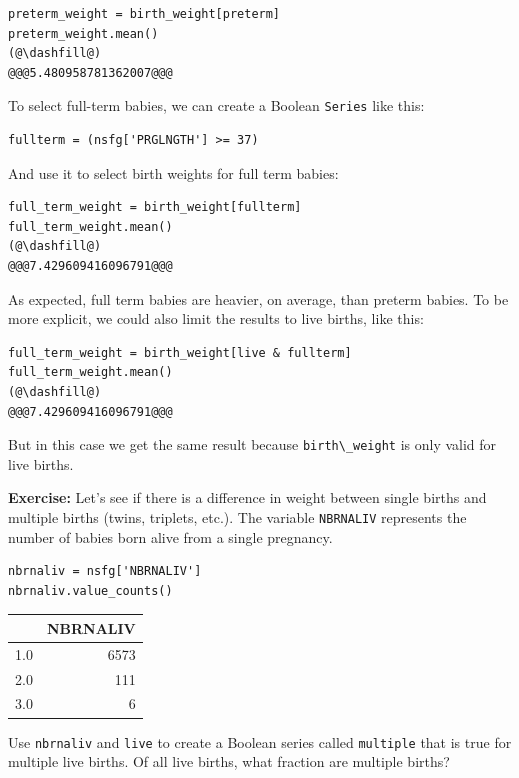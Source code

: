 \begin{lstlisting}[]
preterm_weight = birth_weight[preterm]
preterm_weight.mean()
(@\dashfill@)
@@@5.480958781362007@@@
\end{lstlisting}

To select full-term babies, we can create a Boolean
\passthrough{\lstinline!Series!} like this:

\begin{lstlisting}[]
fullterm = (nsfg['PRGLNGTH'] >= 37)
\end{lstlisting}

And use it to select birth weights for full term babies:

\begin{lstlisting}[]
full_term_weight = birth_weight[fullterm]
full_term_weight.mean()
(@\dashfill@)
@@@7.429609416096791@@@
\end{lstlisting}

As expected, full term babies are heavier, on average, than preterm
babies. To be more explicit, we could also limit the results to live
births, like this:

\begin{lstlisting}[]
full_term_weight = birth_weight[live & fullterm]
full_term_weight.mean()
(@\dashfill@)
@@@7.429609416096791@@@
\end{lstlisting}

But in this case we get the same result because
\passthrough{\lstinline!birth\_weight!} is only valid for live births.

\textbf{Exercise:} Let's see if there is a difference in weight between
single births and multiple births (twins, triplets, etc.). The variable
\passthrough{\lstinline!NBRNALIV!} represents the number of babies born
alive from a single pregnancy.

\begin{lstlisting}[]
nbrnaliv = nsfg['NBRNALIV']
nbrnaliv.value_counts()
\end{lstlisting}

\begin{tabular}{lr}
\midrule
{} &  NBRNALIV \\
\midrule
1.0 &      6573 \\
2.0 &       111 \\
3.0 &         6 \\
\midrule
\end{tabular}

Use \passthrough{\lstinline!nbrnaliv!} and
\passthrough{\lstinline!live!} to create a Boolean series called
\passthrough{\lstinline!multiple!} that is true for multiple live
births. Of all live births, what fraction are multiple births?

